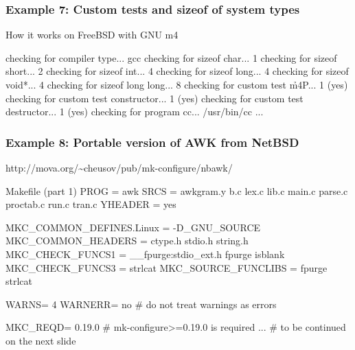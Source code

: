 \documentclass[hyperref={colorlinks=true}]{beamer}
\begin{document}
\begin{frame}[fragile]
  \frametitle{Example 7: Custom tests and sizeof of system types}

  \begin{block}{How it works on FreeBSD with GNU m4}
  \begin{CodeNoLabel}
checking for compiler type... gcc
checking for sizeof char... 1
checking for sizeof short... 2
checking for sizeof int... 4
checking for sizeof long... 4
checking for sizeof void*... 4
checking for sizeof long long... 8
checking for custom test \h{m4P... 1 (yes)}
checking for custom test constructor... 1 (yes)
checking for custom test destructor... 1 (yes)
checking for program cc... /usr/bin/cc
...
\prompt{\$}
  \end{CodeNoLabel}
  \end{block}
\end{frame}

\begin{frame}[fragile]
  \frametitle{Example 8: Portable version of AWK from NetBSD}

\begin{block}{http://mova.org/\~{}cheusov/pub/mk-configure/nbawk/}
\begin{Code}{Makefile (part 1)}
PROG =	awk
SRCS =	awkgram.y b.c lex.c lib.c main.c parse.c
        proctab.c run.c tran.c
YHEADER =	yes

MKC\_COMMON\_DEFINES.Linux =	-D\_GNU\_SOURCE
MKC\_COMMON\_HEADERS =		ctype.h stdio.h string.h
MKC\_CHECK\_FUNCS1 =		\_\_fpurge:stdio\_ext.h fpurge isblank
MKC\_CHECK\_FUNCS3 =		strlcat
MKC\_SOURCE\_FUNCLIBS =		fpurge strlcat

WARNS=           4
WARNERR=         no # do not treat warnings as errors

MKC\_REQD=       0.19.0 # mk-configure>=0.19.0 is required
... # to be continued on the next slide
\end{Code}
\end{block}
\end{frame}
\end{document}
